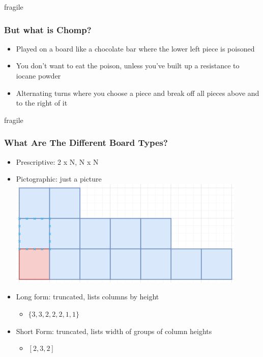 \documentclass[aspectratio=169,usenames,dvipsnames]{beamer}
\begin{document}
\begin{frame}{fragile}
    \frametitle{But what is Chomp?}

    \begin{itemize}
        \item Played on a board like a chocolate bar where the lower left piece is poisoned
        \item You don’t want to eat the poison, unless you’ve built up a resistance to iocane powder
        \item Alternating turns where you choose a piece and break off all pieces above and to the right of it
    \end{itemize}
\end{frame}

\begin{frame}{fragile}
    \frametitle{What Are The Different Board Types?}

    \begin{itemize}
        \item Prescriptive: 2 x N, N x N
        \item Pictographic: just a picture\\ \includegraphics[scale=0.75]{[2, 3, 2].png}
        \item Long form: truncated, lists columns by height 
        \begin{itemize}
            \item $\texttt{\{}3, 3, 2, 2, 2, 1, 1\texttt{\}}$
        \end{itemize}
        \item Short Form: truncated, lists width of groups of column heights 
        \begin{itemize}
            \item $[2, 3, 2]$
        \end{itemize}
    \end{itemize}
\end{frame}
\end{document}

